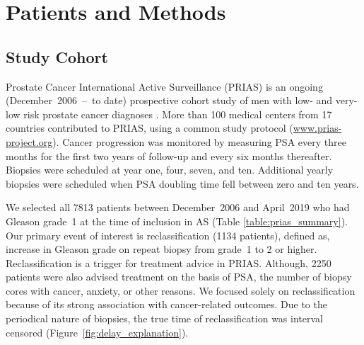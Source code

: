 \section{Patients and Methods}

\subsection{Study Cohort}
\label{subsec:cohort}
Prostate Cancer International Active Surveillance (PRIAS) is an ongoing (December~2006~--~to date) prospective cohort study of men with low- and very-low risk prostate cancer diagnoses \cite{bul2013active}. More than 100 medical centers from 17 countries contributed to PRIAS, using a common study protocol (\url{www.prias-project.org}). Cancer progression was monitored by measuring PSA every three months for the first two years of follow-up and every six months thereafter. Biopsies were scheduled at year one, four, seven, and ten. Additional yearly biopsies were scheduled when PSA doubling time fell between zero and ten years.

We selected all 7813 patients between December~2006 and April~2019 who had Gleason grade~1 \citep{epsteinGG2014} at the time of inclusion in AS (Table \ref{table:prias_summary}). Our primary event of interest is reclassification (1134 patients), defined as, increase in Gleason grade on repeat biopsy from grade~1 to 2 or higher. Reclassification is a trigger for treatment advice in PRIAS. Although, 2250 patients were also advised treatment on the basis of PSA, the number of biopsy cores with cancer, anxiety, or other reasons. We focused solely on reclassification because of its strong association with cancer-related outcomes. Due to the periodical nature of biopsies, the true time of reclassification was interval censored (Figure~\ref{fig:delay_explanation}).

